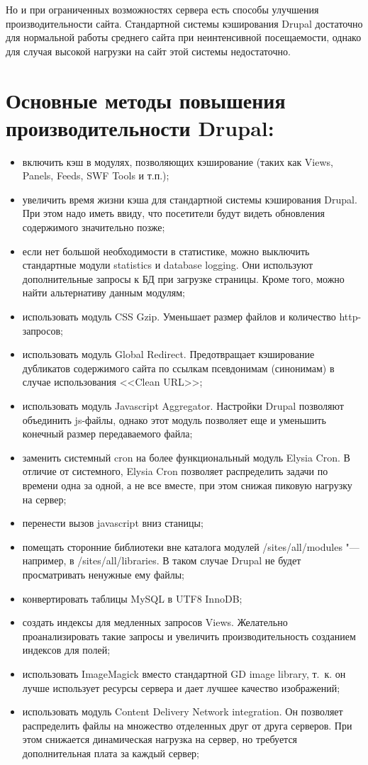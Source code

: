 \documentclass[10pt, a5paper]{article}
\begin{document}
Но и при ограниченных возможностях сервера есть способы улучшения производительности сайта. Стандартной системы кэширования Drupal достаточно для нормальной работы среднего сайта при неинтенсивной посещаемости, однако для случая высокой нагрузки на сайт этой системы недостаточно.

\section*{Основные методы повышения производительности Drupal:}
\begin{itemize}
	\item включить кэш в модулях, позволяющих кэширование (таких как Views, Panels, Feeds, SWF Tools и т.п.);
	\item увеличить время жизни кэша для стандартной системы кэширования Drupal. При этом надо иметь ввиду, что посетители будут видеть обновления содержимого значительно позже;
	\item если нет большой необходимости в статистике, можно выключить стандартные модули statistics и database logging. Они используют дополнительные запросы к БД при загрузке страницы. Кроме того, можно найти альтернативу данным модулям;
	\item использовать модуль CSS Gzip. Уменьшает размер файлов и количество http-запросов;
	\item использовать модуль Global Redirect. Предотвращает кэширование дубликатов содержимого сайта по ссылкам псевдонимам (синонимам) в случае использования <<Clean URL>>;
	\item использовать модуль Javascript Aggregator. Настройки Drupal позволяют объединить js-файлы, однако этот модуль позволяет еще и уменьшить конечный размер передаваемого файла;
	\item заменить системный cron на более функциональный модуль Elysia Cron. В отличие от системного, Elysia Cron позволяет распределить задачи по времени одна за одной, а не все вместе, при этом снижая пиковую нагрузку на сервер;
	\item перенести вызов javascript вниз станицы;
	\item помещать сторонние библиотеки вне каталога модулей \linebreak /sites/all/modules "--- например, в /sites/all/libraries. В таком \linebreak случае Drupal не будет просматривать ненужные ему файлы;
	\item конвертировать таблицы MySQL в UTF8 InnoDB;
	\item создать индексы для медленных запросов Views. Желательно проанализировать такие запросы и увеличить производительность созданием индексов для полей;
	\item использовать ImageMagick вместо стандартной GD image \linebreak library, т.~к. он лучше использует ресурсы сервера и дает лучшее качество изображений;
	\item использовать модуль Content Delivery Network integration. Он позволяет распределить файлы на множество отделенных друг от друга серверов. При этом снижается динамическая нагрузка на сервер, но требуется дополнительная плата за каждый сервер;
\end{itemize}
\end{document}
